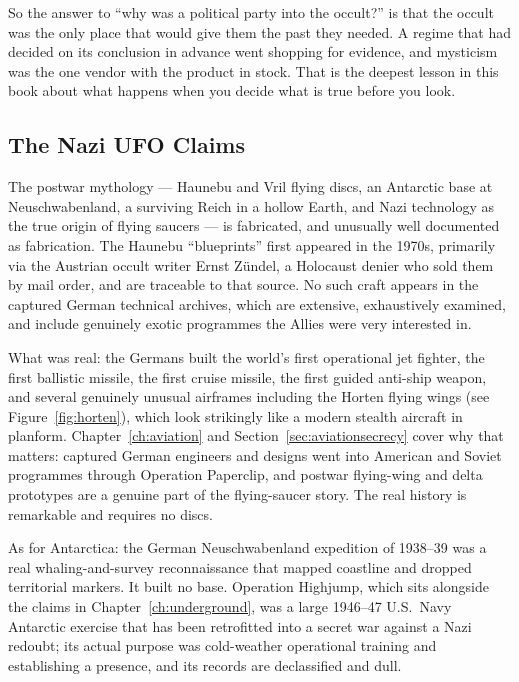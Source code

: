 So the answer to ``why was a political party into the occult?'' is that the occult was the only place
that would give them the past they needed. A regime that had decided on its conclusion in advance went
shopping for evidence, and mysticism was the one vendor with the product in stock. That is the deepest
lesson in this book about what happens when you decide what is true before you look.

\subsection{The Nazi UFO Claims}

The postwar mythology --- Haunebu and Vril flying discs, an Antarctic base at Neuschwabenland, a
surviving Reich in a hollow Earth, and Nazi technology as the true origin of flying saucers --- is
fabricated, and unusually well documented as fabrication. The Haunebu ``blueprints'' first appeared
in the 1970s, primarily via the Austrian occult writer Ernst Zündel, a Holocaust denier who sold them
by mail order, and are traceable to that source. No such craft appears in the captured German
technical archives, which are extensive, exhaustively examined, and include genuinely exotic
programmes the Allies were very interested in.

What was real: the Germans built the world's first operational jet fighter, the first ballistic
missile, the first cruise missile, the first guided anti-ship weapon, and several genuinely unusual
airframes including the Horten flying wings (see Figure~\ref{fig:horten}), which look strikingly like a modern stealth aircraft in
planform. Chapter~\ref{ch:aviation} and Section~\ref{sec:aviationsecrecy} cover why that matters:
captured German engineers and designs went into American and Soviet programmes through Operation
Paperclip, and postwar flying-wing and delta prototypes are a genuine part of the flying-saucer story.
The real history is remarkable and requires no discs.

As for Antarctica: the German Neuschwabenland expedition of 1938--39 was a real whaling-and-survey
reconnaissance that mapped coastline and dropped territorial markers. It built no base. Operation
Highjump, which sits alongside the claims in Chapter~\ref{ch:underground}, was a large 1946--47 U.S.\ Navy
Antarctic exercise that has been retrofitted into a secret war against a Nazi redoubt; its actual
purpose was cold-weather operational training and establishing a presence, and its records are
declassified and dull.

